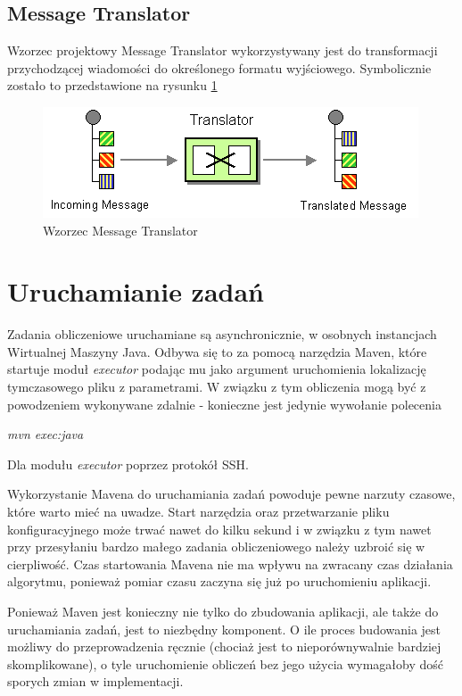 \subsection{Message Translator}
Wzorzec projektowy Message Translator wykorzystywany jest do transformacji przychodzącej wiadomości do określonego formatu wyjściowego.
Symbolicznie zostało to przedstawione na rysunku \ref{fig:messageTranslator}

\begin{figure}[!h]
 \centering
 \includegraphics{eip/MessageTranslator}
 \caption{Wzorzec Message Translator}
 \label{fig:messageTranslator}
\end{figure}

\section{Uruchamianie zadań}

Zadania obliczeniowe uruchamiane są asynchronicznie, w osobnych instancjach Wirtualnej Maszyny Java.
Odbywa się to za pomocą narzędzia Maven, które startuje moduł {\it executor} podając mu jako argument uruchomienia lokalizację tymczasowego pliku z parametrami.
W związku z tym obliczenia mogą być z powodzeniem wykonywane zdalnie - konieczne jest jedynie wywołanie polecenia

{\it mvn exec:java}

Dla modułu {\it executor} poprzez protokół SSH.

Wykorzystanie Mavena do uruchamiania zadań powoduje pewne narzuty czasowe, które warto mieć na uwadze.
Start narzędzia oraz przetwarzanie pliku konfiguracyjnego może trwać nawet do kilku sekund i w związku z tym nawet przy przesyłaniu bardzo małego zadania obliczeniowego należy uzbroić się w cierpliwość.
Czas startowania Mavena nie ma wpływu na zwracany czas działania algorytmu, ponieważ pomiar czasu zaczyna się już po uruchomieniu aplikacji.

Ponieważ Maven jest konieczny nie tylko do zbudowania aplikacji, ale także do uruchamiania zadań, jest to niezbędny komponent.
O ile proces budowania jest możliwy do przeprowadzenia ręcznie (chociaż jest to nieporównywalnie bardziej skomplikowane), o tyle uruchomienie obliczeń bez jego użycia wymagałoby dość sporych zmian w implementacji.
